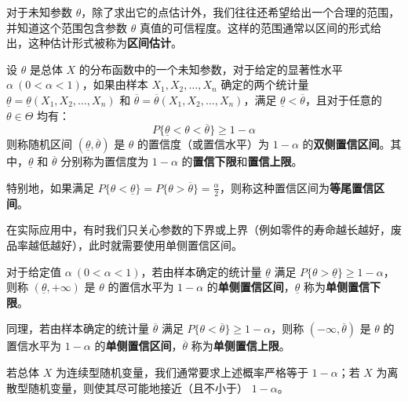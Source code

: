 \documentclass[lang=cn,11pt]{elegantbook}
\begin{document}
对于未知参数 $\theta$，除了求出它的点估计外，我们往往还希望给出一个合理的范围，并知道这个范围包含参数 $\theta$ 真值的可信程度。这样的范围通常以区间的形式给出，这种估计形式被称为\textbf{区间估计}。

\begin{definition}[置信区间与置信水平] \label{def:confidence_interval}
设 $\theta$ 是总体 $X$ 的分布函数中的一个未知参数，对于给定的显著性水平 $\alpha\ (0<\alpha<1)$，如果由样本 $X_1,X_2,\dots,X_n$ 确定的两个统计量 $\underline{\theta}=\underline{\theta}(X_1,X_2,\dots,X_n)$ 和 $\overline{\theta}=\overline{\theta}(X_1,X_2,\dots,X_n)$，满足 $\underline{\theta} < \overline{\theta}$，且对于任意的 $\theta \in \Theta$ 均有：
\begin{equation}
P\{\underline{\theta}<\theta<\overline{\theta}\} \ge 1-\alpha
\end{equation}
则称随机区间 $(\underline{\theta},\overline{\theta})$ 是 $\theta$ 的置信度（或置信水平）为 $1-\alpha$ 的\textbf{双侧置信区间}。其中，$\underline{\theta}$ 和 $\overline{\theta}$ 分别称为置信度为 $1-\alpha$ 的\textbf{置信下限}和\textbf{置信上限}。

特别地，如果满足 $P\{\theta < \underline{\theta}\} = P\{\theta > \overline{\theta}\} = \frac{\alpha}{2}$，则称这种置信区间为\textbf{等尾置信区间}。
\end{definition}

在实际应用中，有时我们只关心参数的下界或上界（例如零件的寿命越长越好，废品率越低越好），此时就需要使用单侧置信区间。

\begin{definition}[单侧置信区间] \label{def:one_sided_confidence_interval}
对于给定值 $\alpha\ (0<\alpha<1)$，若由样本确定的统计量 $\underline{\theta}$ 满足 $P\{\theta > \underline{\theta}\} \ge 1-\alpha$，则称 $(\underline{\theta},+\infty)$ 是 $\theta$ 的置信水平为 $1-\alpha$ 的\textbf{单侧置信区间}，$\underline{\theta}$ 称为\textbf{单侧置信下限}。

同理，若由样本确定的统计量 $\overline{\theta}$ 满足 $P\{\theta < \overline{\theta}\} \ge 1-\alpha$，则称 $(-\infty,\overline{\theta})$ 是 $\theta$ 的置信水平为 $1-\alpha$ 的\textbf{单侧置信区间}，$\overline{\theta}$ 称为\textbf{单侧置信上限}。
\end{definition}

\begin{note}
若总体 $X$ 为连续型随机变量，我们通常要求上述概率严格等于 $1-\alpha$；若 $X$ 为离散型随机变量，则使其尽可能地接近（且不小于） $1-\alpha$。
\end{note}
\end{document}
